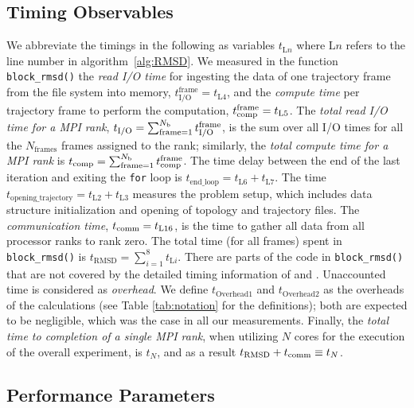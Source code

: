 \subsection{Timing Observables}

We abbreviate the timings in the following as variables $t_{\text{L$n$}}$ where $\text{L$n$}$ refers to the line number in algorithm~\ref{alg:RMSD}.
We measured in the function \texttt{block\_rmsd()} the \emph{read I/O time} for ingesting the data of one trajectory frame from the file system into memory, $t_{\text{I/O}}^{\text{frame}} = t_{\text{L4}}$, and the \emph{compute time} per trajectory frame to perform the computation, ${t}_{\text{comp}}^{\text{frame}} = t_{\text{L5}}$.
The \emph{total read I/O time for a MPI rank},  ${t}_{\text{I/O}} = \sum_{\text{frame}=1}^{N_{\text{b}}} {t}_{\text{I/O}}^{\text{frame}}$, is the sum over all I/O times for all the $N_{\text{frames}}$ frames assigned to the rank; similarly, the \emph{total compute time for a MPI rank} is ${t}_{\text{comp}} = \sum_{\text{frame}=1}^{N_{\text{b}}} {t}_{\text{comp}}^{\text{frame}}$. 
The time delay between the end of the last iteration and exiting the \texttt{for} loop is $t_{\text{end\_loop}} = t_{\text{L6}}+t_{\text{L7}}$.
The time $t_{\text{opening\_trajectory}} = t_{\text{L2}}+t_{\text{L3}}$ measures the problem setup, which includes data structure initialization and opening of topology and trajectory files.
The \emph{communication time}, $t_{\text{comm}} = t_{\text{L16}}$, is the time to gather all data from all processor ranks to rank zero.
The total time (for all frames) spent in \texttt{block\_rmsd()} is $t_{\text{RMSD}} = \sum_{i=1}^{8}t_{\text{L$i$}}$. 
There are parts of the code in \texttt{block\_rmsd()} that are not covered by the detailed timing information of \tcomp and \tIO.
Unaccounted time is considered as \emph{overhead}.
We define $t_{\text{Overhead1}}$ and $t_{\text{Overhead2}}$ as the overheads of the calculations (see Table \ref{tab:notation} for the definitions); both are expected to be negligible, which was the case in all our measurements. 
Finally, the \emph{total time to completion of a single MPI rank}, when utilizing $N$ cores for the execution of the overall experiment, is $t_{N}$, and as a result $t_{\text{RMSD}} + t_{\text{comm}} \equiv t_{N}$.

\subsection{Performance Parameters}

